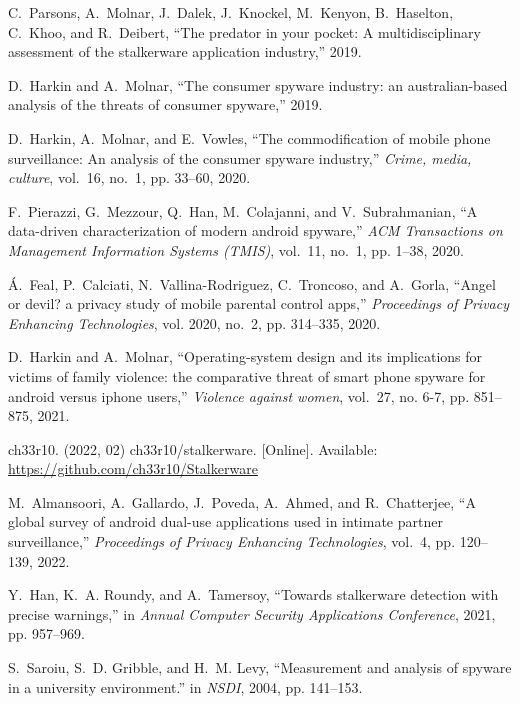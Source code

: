 \documentclass[sigconf,balance=false]{acmart}
\begin{document}
\begin{thebibliography}{100}
C.~Parsons, A.~Molnar, J.~Dalek, J.~Knockel, M.~Kenyon, B.~Haselton, C.~Khoo,
  and R.~Deibert, ``The predator in your pocket: A multidisciplinary assessment
  of the stalkerware application industry,'' 2019.

D.~Harkin and A.~Molnar, ``The consumer spyware industry: an australian-based
  analysis of the threats of consumer spyware,'' 2019.

D.~Harkin, A.~Molnar, and E.~Vowles, ``The commodification of mobile phone
  surveillance: An analysis of the consumer spyware industry,'' \emph{Crime,
  media, culture}, vol.~16, no.~1, pp. 33--60, 2020.

F.~Pierazzi, G.~Mezzour, Q.~Han, M.~Colajanni, and V.~Subrahmanian, ``A
  data-driven characterization of modern android spyware,'' \emph{ACM
  Transactions on Management Information Systems (TMIS)}, vol.~11, no.~1, pp.
  1--38, 2020.

{\'A}.~Feal, P.~Calciati, N.~Vallina-Rodriguez, C.~Troncoso, and A.~Gorla,
  ``Angel or devil? a privacy study of mobile parental control apps,''
  \emph{Proceedings of Privacy Enhancing Technologies}, vol. 2020, no.~2, pp.
  314--335, 2020.

D.~Harkin and A.~Molnar, ``Operating-system design and its implications for
  victims of family violence: the comparative threat of smart phone spyware for
  android versus iphone users,'' \emph{Violence against women}, vol.~27, no.
  6-7, pp. 851--875, 2021.

\BIBentryALTinterwordspacing
ch33r10. (2022, 02) ch33r10/stalkerware. [Online]. Available:
  \url{https://github.com/ch33r10/Stalkerware}
\BIBentrySTDinterwordspacing

M.~Almansoori, A.~Gallardo, J.~Poveda, A.~Ahmed, and R.~Chatterjee, ``A global
  survey of android dual-use applications used in intimate partner
  surveillance,'' \emph{Proceedings of Privacy Enhancing Technologies}, vol.~4,
  pp. 120--139, 2022.

Y.~Han, K.~A. Roundy, and A.~Tamersoy, ``Towards stalkerware detection with
  precise warnings,'' in \emph{Annual Computer Security Applications
  Conference}, 2021, pp. 957--969.

S.~Saroiu, S.~D. Gribble, and H.~M. Levy, ``Measurement and analysis of spyware
  in a university environment.'' in \emph{NSDI}, 2004, pp. 141--153.


\end{thebibliography}
\end{document}

